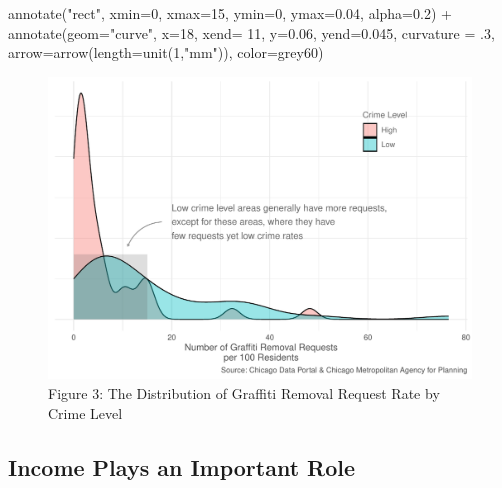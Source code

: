 \documentclass[
]{report}
\newenvironment{Shaded}{}{}
\newcommand{\AttributeTok}[1]{\textcolor[rgb]{0.84,0.23,0.29}{#1}}
\newcommand{\DecValTok}[1]{\textcolor[rgb]{0.00,0.36,0.77}{#1}}
\newcommand{\FloatTok}[1]{\textcolor[rgb]{0.00,0.36,0.77}{#1}}
\newcommand{\FunctionTok}[1]{\textcolor[rgb]{0.44,0.26,0.76}{#1}}
\newcommand{\NormalTok}[1]{\textcolor[rgb]{0.14,0.16,0.18}{#1}}
\newcommand{\SpecialCharTok}[1]{\textcolor[rgb]{0.00,0.36,0.77}{#1}}
\newcommand{\StringTok}[1]{\textcolor[rgb]{0.01,0.18,0.38}{#1}}
\begin{document}
\begin{Shaded}
\begin{Highlighting}[]
  \FunctionTok{annotate}\NormalTok{(}\StringTok{"rect"}\NormalTok{, }\AttributeTok{xmin=}\DecValTok{0}\NormalTok{, }\AttributeTok{xmax=}\DecValTok{15}\NormalTok{, }\AttributeTok{ymin=}\DecValTok{0}\NormalTok{, }\AttributeTok{ymax=}\FloatTok{0.04}\NormalTok{, }\AttributeTok{alpha=}\FloatTok{0.2}\NormalTok{) }\SpecialCharTok{+}
  \FunctionTok{annotate}\NormalTok{(}\AttributeTok{geom=}\StringTok{"curve"}\NormalTok{, }\AttributeTok{x=}\DecValTok{18}\NormalTok{, }\AttributeTok{xend=} \DecValTok{11}\NormalTok{, }\AttributeTok{y=}\FloatTok{0.06}\NormalTok{, }\AttributeTok{yend=}\FloatTok{0.045}\NormalTok{,}
           \AttributeTok{curvature =}\NormalTok{ .}\DecValTok{3}\NormalTok{, }\AttributeTok{arrow=}\FunctionTok{arrow}\NormalTok{(}\AttributeTok{length=}\FunctionTok{unit}\NormalTok{(}\DecValTok{1}\NormalTok{,}\StringTok{"mm"}\NormalTok{)), }\AttributeTok{color=}\StringTok{\textquotesingle{}grey60\textquotesingle{}}\NormalTok{)}
\end{Highlighting}
\end{Shaded}

\begin{figure}[H]

\caption{Figure 3: The Distribution of Graffiti Removal Request Rate by
Crime Level}

{\centering \includegraphics{final_solo_files/figure-pdf/unnamed-chunk-4-1.pdf}

}

\end{figure}

\hypertarget{income-plays-an-important-role}{%
\subsection{Income Plays an Important
Role}\label{income-plays-an-important-role}}
\end{document}
